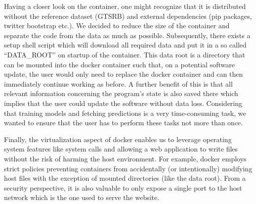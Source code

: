 Having a closer look on the container, one might recognize that it is distributed without the reference dataset (GTSRB) and external dependencies (pip packages, twitter bootstrap etc.).
We decided to reduce the size of the container and separate the code from the data as much as possible.
Subsequently, there exists a setup shell script which will download all required data and put it in a so called \enquote{DATA\_ROOT} on startup of the container.
This data root is a directory that can be mounted into the docker container such that, on a potential software update, the user would only need to replace the docker container and can then immediately continue working as before.
A further benefit of this is that all relevant information concerning the program's state is also saved there which implies that the user could update the software without data loss.
Considering that training models and fetching predictions is a very time-consuming task, we wanted to ensure that the user has to perform these tasks not more than once.

Finally, the virtualization aspect of docker enables us to leverage operating system features like system calls and allowing a web application to write files without the risk of harming the host environment.
For example, docker employs strict policies preventing containers from accidentally (or intentionally) modifying host files with the exception of mounted directories (like the data root).
From a security perspective, it is also valuable to only expose a single port to the host network which is the one used to serve the website.

